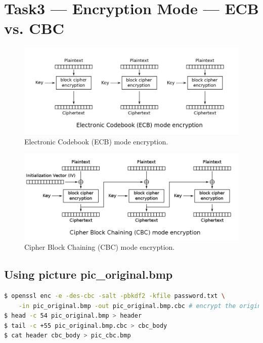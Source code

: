 \section{Task3 --- Encryption Mode --- ECB vs. CBC}
%

\begin{figure}
    \centering
    \includegraphics[height=\textheight,width=\textwidth,keepaspectratio]
    {figures/ECB_encryption.png}
    \caption{Electronic Codebook (ECB) mode encryption.}\label{fig:ecb_mode}
\end{figure}

\begin{figure}
    \centering
    \includegraphics[height=\textheight,width=\textwidth,keepaspectratio]
    {figures/CBC_encryption.png}
    \caption{Cipher Block Chaining (CBC) mode encryption.}\label{fig:cbc_mode}
\end{figure}



\subsection{Using picture {\selectfont pic\_original.bmp}}
%
\begin{lstlisting}[language=Bash, caption=Commands generating
    {\fontfamily{qcr}\selectfont pic\_cbc.bmp}, label={lst:pic_cbc}]
$ openssl enc -e -des-cbc -salt -pbkdf2 -kfile password.txt \
    -in pic_original.bmp -out pic_original.bmp.cbc # encrypt the original picture
$ head -c 54 pic_original.bmp > header
$ tail -c +55 pic_original.bmp.cbc > cbc_body
$ cat header cbc_body > pic_cbc.bmp
\end{lstlisting}

